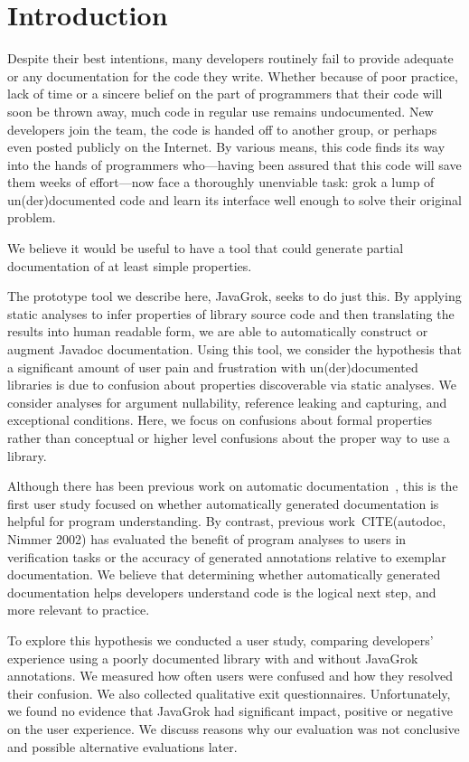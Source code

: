 \section{Introduction}

Despite their best intentions, many developers routinely fail to provide
adequate or any documentation for the code they write.  Whether because of poor
practice, lack of time or a sincere belief on the part of programmers that their
code will soon be thrown away, much code in regular use remains undocumented.
New developers join the team, the code is handed off to another group, or
perhaps even posted publicly on the Internet.  By various means, this code
finds its way into the hands of programmers who---having been assured that this
code will save them weeks of effort---now face a thoroughly unenviable task:
grok a lump of un(der)documented code and learn its interface well enough
to solve their original problem.

We believe it would be useful to have a tool that could generate partial
documentation of at least simple properties.

The prototype tool we describe here, JavaGrok, seeks to do just this.  By
applying static analyses to infer properties of library source code and then
translating the results into human readable form, we are able to
automatically construct or augment Javadoc documentation.
Using this tool, we
consider the hypothesis that a significant amount of user pain and frustration
with un(der)documented libraries is due to confusion about
properties discoverable via static analyses. We consider analyses for argument nullability,
reference leaking and capturing, and exceptional conditions.
Here, we focus on confusions about formal properties
rather than conceptual
or higher level confusions about the proper way to use a library.

Although there has been previous work on automatic
documentation~\cite{autodoc}, this is the first user study
focused on whether automatically generated documentation is helpful for program
understanding.  By contrast, previous work~CITE(autodoc, Nimmer 2002) has
evaluated the benefit of program analyses to users in verification tasks or the
accuracy of generated annotations relative to exemplar documentation.
We believe that determining whether automatically generated documentation helps
developers understand code is the logical next step, and more relevant to practice.

To explore this hypothesis we conducted a user study, comparing developers'
experience using a poorly documented library with and without JavaGrok
annotations.  We measured how often users were confused and how they resolved their confusion.  We also collected qualitative exit
questionnaires.  Unfortunately, we found no evidence that JavaGrok had
significant impact, positive or negative on the user experience.  We discuss
reasons why our evaluation was not conclusive and possible alternative
evaluations later.
